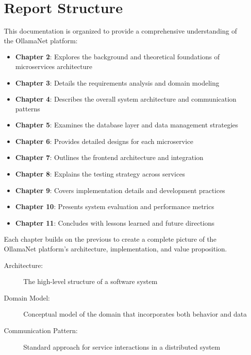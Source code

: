 \section{Report Structure}

This documentation is organized to provide a comprehensive understanding of the OllamaNet platform:

\begin{itemize}
    \item \textbf{Chapter 2}: Explores the background and theoretical foundations of microservices architecture
    \item \textbf{Chapter 3}: Details the requirements analysis and domain modeling
    \item \textbf{Chapter 4}: Describes the overall system architecture and communication patterns
    \item \textbf{Chapter 5}: Examines the database layer and data management strategies
    \item \textbf{Chapter 6}: Provides detailed designs for each microservice
    \item \textbf{Chapter 7}: Outlines the frontend architecture and integration
    \item \textbf{Chapter 8}: Explains the testing strategy across services
    \item \textbf{Chapter 9}: Covers implementation details and development practices
    \item \textbf{Chapter 10}: Presents system evaluation and performance metrics
    \item \textbf{Chapter 11}: Concludes with lessons learned and future directions
\end{itemize}

Each chapter builds on the previous to create a complete picture of the OllamaNet platform's architecture, implementation, and value proposition.

\begin{terminology}
\begin{description}
    \item[Architecture:] The high-level structure of a software system
    \item[Domain Model:] Conceptual model of the domain that incorporates both behavior and data
    \item[Communication Pattern:] Standard approach for service interactions in a distributed system
\end{description}
\end{terminology}





